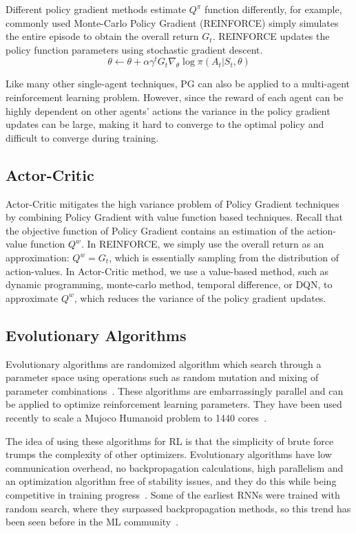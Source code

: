 Different policy gradient methods estimate $Q^\pi$ function differently, for
example, commonly used Monte-Carlo Policy Gradient (REINFORCE) simply
simulates the entire episode to obtain the overall return $G_t$. REINFORCE
updates the policy function parameters using stochastic gradient descent.
\begin{equation}
\theta \leftarrow \theta
	+ \alpha \gamma^t G_t \nabla_\theta \log \pi (A_t|S_t, \theta)
\end{equation}

Like many other single-agent techniques, PG can also be applied to a
multi-agent reinforcement learning problem. However, since the reward of each
agent can be highly dependent on other agents' actions the variance in the
policy gradient updates can be large, making it hard to converge to the
optimal policy and difficult to converge during training.


\subsection{Actor-Critic}

Actor-Critic mitigates the high variance problem of Policy Gradient techniques
by combining Policy Gradient with value function based techniques. Recall that
the objective function of Policy Gradient contains an estimation of the
action-value function $Q^w$. In REINFORCE, we simply use the overall return as
an approximation: $Q^w = G_t$, which is essentially sampling from the
distribution of action-values. In Actor-Critic method, we use a value-based
method, such as dynamic programming, monte-carlo method, temporal difference,
or DQN, to approximate $Q^w$, which reduces the variance of the policy
gradient updates.


\subsection{Evolutionary Algorithms}

Evolutionary algorithms are randomized algorithm which search through a
parameter space using operations such as random mutation and mixing of
parameter combinations~\cite{man1996genetic}. These algorithms are
embarrassingly parallel and can be applied to optimize reinforcement learning
parameters. They have been used recently to scale a Mujoco Humanoid problem to
1440 cores~\cite{salimans2017evolution}.

The idea of using these algorithms for RL is that the simplicity of brute
force trumps the complexity of other optimizers. Evolutionary algorithms have
low communication overhead, no backpropagation calculations, high parallelism
and an optimization algorithm free of stability issues, and they do this while
being competitive in training progress~\cite{salimans2017evolution}. Some of
the earliest RNNs were trained with random search, where they surpassed
backpropagation methods, so this trend has been seen before in the ML
community~\cite{hochreiter1997long}.

